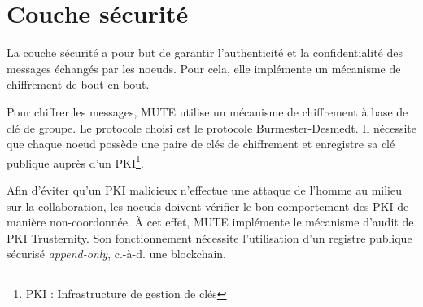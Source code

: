 \documentclass[12pt]{thesul}
\newcommand{\ie}{c.-à-d. }
\begin{document}


\section{Couche sécurité}

La couche sécurité a pour but de garantir l'authenticité et la confidentialité des messages échangés par les noeuds.
Pour cela, elle implémente un mécanisme de chiffrement de bout en bout.

Pour chiffrer les messages, MUTE utilise un mécanisme de chiffrement à base de clé de groupe.
Le protocole choisi est le protocole Burmester-Desmedt\cite{1995-burmester-desmedt}.
Il nécessite que chaque noeud possède une paire de clés de chiffrement et enregistre sa clé publique auprès d'un PKI\footnote{\acf{PKI} : Infrastructure de gestion de clés}.

Afin d'éviter qu'un \ac{PKI} malicieux n'effectue une attaque de l'homme au milieu sur la collaboration, les noeuds doivent vérifier le bon comportement des PKI de manière non-coordonnée.
À cet effet, MUTE implémente le mécanisme d'audit de PKI Trusternity\cite{2018-trusternity-short, 2018-trusternity-long}.
Son fonctionnement nécessite l'utilisation d'un registre publique sécurisé \emph{append-only}, \ie une blockchain.
\end{document}
